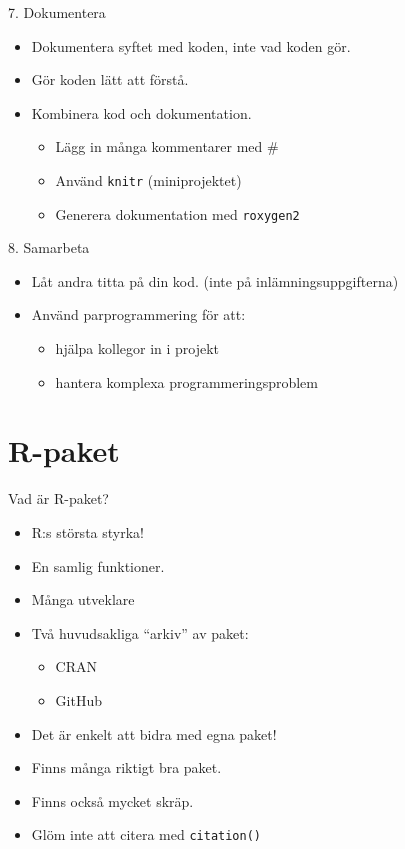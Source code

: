 \documentclass[
  11pt,
  ignorenonframetext,
]{beamer}
\providecommand{\tightlist}{%
  \setlength{\itemsep}{0pt}\setlength{\parskip}{0pt}}
\begin{document}
\begin{frame}{7. Dokumentera}
\protect\hypertarget{dokumentera}{}
\begin{itemize}
\tightlist
\item
  Dokumentera syftet med koden, inte vad koden gör.
\item
  Gör koden lätt att förstå.
\item
  Kombinera kod och dokumentation.

  \begin{itemize}
  \tightlist
  \item
    Lägg in många kommentarer med \#
  \item
    Använd \texttt{knitr} (miniprojektet)
  \item
    Generera dokumentation med \texttt{roxygen2}
  \end{itemize}
\end{itemize}
\end{frame}

\begin{frame}{8. Samarbeta}
\protect\hypertarget{samarbeta}{}
\begin{itemize}
\tightlist
\item
  Låt andra titta på din kod. (inte på inlämningsuppgifterna)
\item
  Använd parprogrammering för att:

  \begin{itemize}
  \tightlist
  \item
    hjälpa kollegor in i projekt
  \item
    hantera komplexa programmeringsproblem
  \end{itemize}
\end{itemize}
\end{frame}

\hypertarget{r-paket}{%
\section{R-paket}\label{r-paket}}

\begin{frame}{Vad är R-paket?}
\protect\hypertarget{vad-uxe4r-r-paket}{}
\begin{itemize}
\tightlist
\item
  R:s största styrka!
\item
  En samlig funktioner.
\item
  Många utveklare
\item
  Två huvudsakliga ``arkiv'' av paket:

  \begin{itemize}
  \tightlist
  \item
    CRAN
  \item
    GitHub
  \end{itemize}
\item
  Det är enkelt att bidra med egna paket!
\item
  Finns många riktigt bra paket.
\item
  Finns också mycket skräp.
\item
  Glöm inte att citera med \texttt{citation()}
\end{itemize}
\end{frame}
\end{document}
